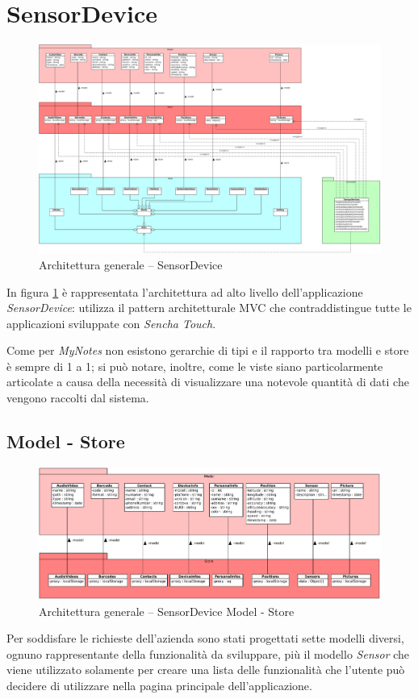 \section{SensorDevice}
\begin{figure}[htb]
\centering
\includegraphics[scale=0.4,angle=90]{gfx/class/SensorDevice.pdf}
\caption{Architettura generale -- SensorDevice}
\label{fig:architettura SensorDevice}
\end{figure}
In figura \ref{fig:architettura SensorDevice} è rappresentata l'architettura ad alto livello dell'applicazione \emph{SensorDevice}: utilizza il pattern architetturale \ac{MVC} che contraddistingue tutte le applicazioni sviluppate con \emph{Sencha Touch}.

Come per \emph{MyNotes} non esistono gerarchie di tipi e il rapporto tra modelli e store è sempre di 1 a 1; si può notare, inoltre, come le viste siano particolarmente articolate a causa della necessità di visualizzare una notevole quantità di dati che vengono raccolti dal sistema.

\subsection{Model - Store}
\begin{figure}[htb]
\centering
\includegraphics[scale=0.4]{gfx/class/SensorDevice_Model_Store.pdf}
\caption{Architettura generale -- SensorDevice Model - Store}
\label{fig:architettura SensorDevice Model-Store}
\end{figure}
Per soddisfare le richieste dell'azienda sono stati progettati sette modelli diversi, ognuno rappresentante della funzionalità da sviluppare, più il modello \emph{Sensor} che viene utilizzato solamente per creare una lista delle funzionalità che l'utente può decidere di utilizzare nella pagina principale dell'applicazione.

